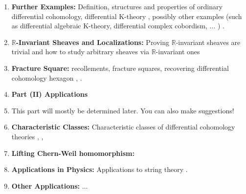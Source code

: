 \documentclass[10pt]{amsart}
\begin{document}
\begin{enumerate}[itemsep=0.3cm]
	\item \textbf{Further Examples:} Definition, structures and properties of ordinary differential cohomology, differential K-theory \cite[Section 7]{adh2021differentialcohomology}, possibly other examples (such as differential algebraic K-theory, differential complex cobordism, ... ) . 
	\item \textbf{$\mathbb{R}$-Invariant Sheaves and Localizations:} Proving $\mathbb{R}$-invariant sheaves are trivial \cite[Section 4]{adh2021differentialcohomology} and how to study arbitrary sheaves via $\mathbb{R}$-invariant ones \cite[Section 5]{adh2021differentialcohomology}
	\item \textbf{Fracture Square:} recollements, fracture squares, recovering differential cohomology hexagon \cite[Section 6]{adh2021differentialcohomology}, \cite{barwickglasman2016recollements,lurie2018sag}.
	\item[] \textbf{\large Part (II) Applications} 
	\item[] This part will mostly be determined later. You can also make suggestions!
	\item \textbf{Characteristic Classes:} Characteristic classes of differential cohomology theories \cite[Section 14]{adh2021differentialcohomology}, \cite{bunkenikolausvoelkl2016differentialcohomology}, \cite[Section 2]{debray2023diffcoh}
	\item \textbf{Lifting Chern-Weil homomorphism:} \cite[Section 13, Section 15]{adh2021differentialcohomology}
	\item \textbf{Applications in Physics:} Applications to string theory \cite{freed2002ktheoryqft}.
	\item \textbf{Other Applications:} ... 
\end{enumerate}

{\footnotesize


}
\end{document}

